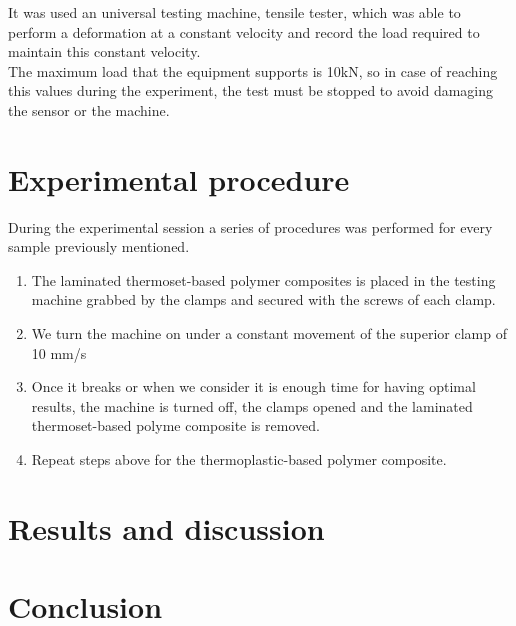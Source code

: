 It was used an universal testing machine, tensile tester, which was able to perform
a deformation at a constant velocity and record the load required to maintain this
constant velocity.\\

The maximum load that the equipment supports is 10kN, so in case of reaching this
values during the experiment, the test must be stopped to avoid damaging the sensor
or the machine.\\


\section{Experimental procedure}

During the experimental session a series of procedures was performed for every
sample previously mentioned.\\

\begin{enumerate}
	\item The laminated thermoset-based polymer composites is placed in the
	testing machine grabbed by the clamps and secured with the screws of each clamp.
	\item We turn the machine on under a constant movement of the superior
	clamp of 10 mm/s
	\item Once it breaks or when we consider it is enough time for having
	optimal results, the machine is turned off, the clamps opened and the
	laminated thermoset-based polyme composite is removed.
	\item Repeat steps above for the thermoplastic-based polymer composite.
\end{enumerate}

\section{Results and discussion}



\section{Conclusion}

